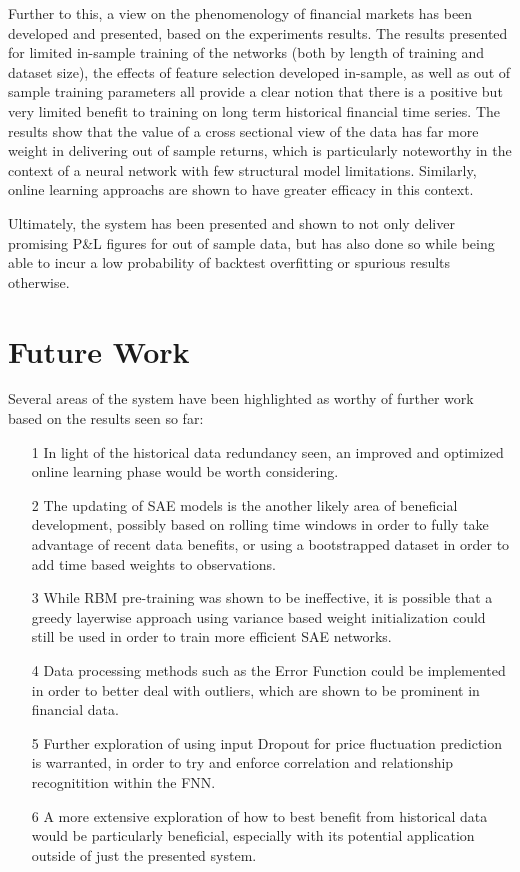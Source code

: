 \documentclass[a4paper,11pt,oneside]{article}
\theoremstyle{plain}
\theoremstyle{definition}
\begin{document}
	Further to this, a view on the phenomenology of financial markets has been developed and presented, based on the experiments results. The results presented for limited in-sample training of the networks (both by length of training and dataset size), the effects of feature selection developed in-sample, as well as out of sample training parameters all provide a clear notion that there is a positive but very limited benefit to training on long term historical financial time series. The results show that the value of a cross sectional view of the data has far more weight in delivering out of sample returns, which is particularly noteworthy in the context of a neural network with few structural model limitations. Similarly, online learning approachs are shown to have greater efficacy in this context. \newline 
	
	Ultimately, the system has been presented and shown to not only deliver promising P\&L figures for out of sample data, but has also done so while being able to incur a low probability of backtest overfitting or spurious results otherwise.
	
	\newpage
	\section{Future Work}
	
	Several areas of the system have been highlighted as worthy of further work based on the results seen so far: 
	\begin{itemize}
		\item [1] In light of the historical data redundancy seen, an improved and optimized online learning phase would be worth considering.
		\item [2] The updating of SAE models is the another likely area of beneficial development, possibly based on rolling time windows in order to fully take advantage of recent data benefits, or using a bootstrapped dataset in order to add time based weights to observations.
		\item [3] While RBM pre-training was shown to be ineffective, it is possible that a greedy layerwise approach using variance based weight initialization could still be used in order to train more efficient SAE networks.
		\item [4] Data processing methods such as the Error Function could be implemented in order to better deal with outliers, which are shown to be prominent in financial data.
		\item [5] Further exploration of using input Dropout for price fluctuation prediction is warranted, in order to try and enforce correlation and relationship recognitition within the FNN.
		\item [6] A more extensive exploration of how to best benefit from historical data would be particularly beneficial, especially with its potential application outside of just the presented system.
	\end{itemize}
	
\end{document}
